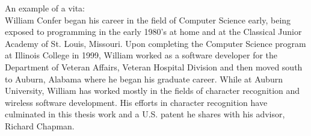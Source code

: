\begin{vita}
An example of a vita:\\
William Confer began his career in the field of Computer Science early,
being exposed to programming in the early 1980's at home and at the
Classical Junior Academy of St. Louis, Missouri.  Upon completing 
the Computer Science program at Illinois College in 1999, William
worked as a software developer for the Department of Veteran Affairs,
Veteran Hospital Division and then moved south to Auburn, Alabama where he began his graduate career.
While at Auburn University, William has worked mostly in the fields of 
character recognition and wireless software development.  His efforts in
character recognition have culminated in this thesis work and a U.S. patent
he shares with his advisor, Richard Chapman.
\end{vita}
